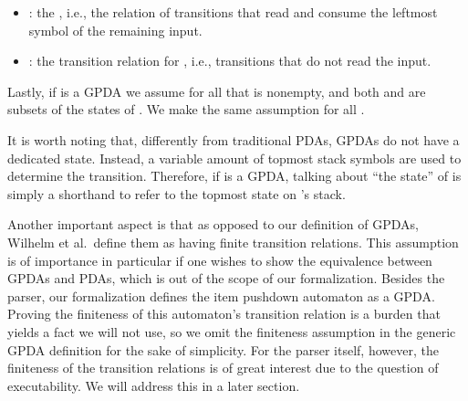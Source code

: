 \begin{isabellebody}
\begin{isamarkuptext}
\begin{definition}
\begin{itemize}
\item {}: the , i.e., 
the relation of transitions that read and consume the leftmost symbol of the remaining input.
\item {}: the transition relation for , 
i.e., transitions that do not read the input.
\end{itemize}
Lastly, if  is a GPDA we assume for all  that  is nonempty, 
and both  and  are subsets of the states of . We make the same assumption for all 
.
\end{definition}

It is worth noting that, differently from traditional PDAs, GPDAs do not have a dedicated state. 
Instead, a variable amount of topmost stack symbols are used to determine the transition. 
Therefore, if  is a GPDA, talking about ``the state'' of  is simply a
shorthand to refer to the topmost state on 's stack.

Another important aspect is that as opposed to our definition of GPDAs, Wilhelm et al.\ define them
as having finite transition relations. This assumption is of importance in particular if one wishes
to show the equivalence between GPDAs and PDAs, which is out of the scope of our formalization.
Besides the parser, our formalization defines the item pushdown automaton as a GPDA. Proving the
finiteness of this automaton's transition relation is a burden that yields a fact we will not use,
so we omit the finiteness assumption in the generic GPDA definition for the sake of simplicity. For
the  parser itself, however, the finiteness of the transition relations is of great interest
due to the question of executability. We will address this in a later section.


\end{isamarkuptext}
\end{isabellebody}
